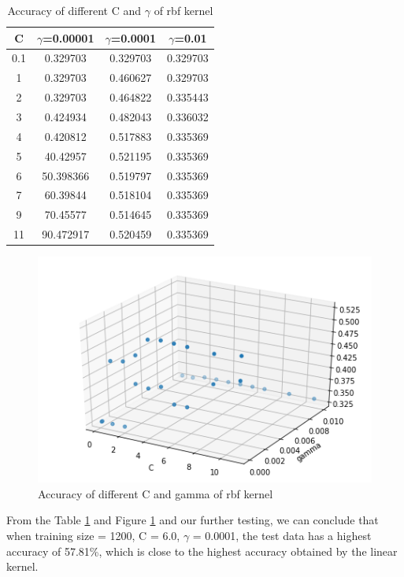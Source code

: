 \begin{table}[h!]
\centering
\begin{tabular}{||c| c | c | c||} 
 \hline
 \textbf{C} & \textbf{$\gamma$=0.00001} & \textbf{$\gamma$=0.0001} & \textbf{$\gamma$=0.01} \\ [0.5ex] 
 \hline\hline
0.1 & 0.329703 & 0.329703 & 0.329703\\\hline
1 & 0.329703 & 0.460627 & 0.329703\\\hline
2 & 0.329703 & 0.464822	& 0.335443\\\hline
3 & 0.424934 & 0.482043	& 0.336032\\\hline
4 & 0.420812 & 0.517883	& 0.335369\\\hline
5 & 40.42957 & 0.521195	& 0.335369\\\hline
6 & 50.398366 & 0.519797 & 0.335369\\\hline
7 & 60.39844 & 0.518104	& 0.335369\\\hline
9 & 70.45577 & 0.514645	& 0.335369\\\hline
11 & 90.472917& 0.520459 & 0.335369\\[1ex] 
 \hline
\end{tabular}
\caption{Accuracy of different C and $\gamma$ of rbf kernel}
\label{table:Accuracy of different C and gamma of rbf kernel}
\end{table}

\begin{figure}[h!]
    \centering
    \includegraphics[scale=0.4]{figures/Accuracy of different C and gamma of rbf kernel.png}
    \caption{Accuracy of different C and gamma of rbf kernel}
    \label{fig:Accuracy of different C and gamma of rbf kernel}
\end{figure}

From the Table \ref{table:Accuracy of different C and gamma of rbf kernel} and Figure \ref{fig:Accuracy of different C and gamma of rbf kernel} and our further testing, we can conclude that when training size = 1200,  C = 6.0, $\gamma$ = 0.0001, the test data has a highest accuracy of 57.81\%, which is close to the highest accuracy obtained by the linear kernel.
